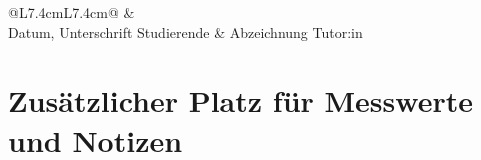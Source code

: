 \documentclass{article}
\newcommand{\bl}[1][2cm]{\underline{\hspace{#1}}}
\begin{document}
\vspace{0.25cm}
\noindent \bl[15cm]

\vspace{0.7cm}
\noindent \bl[15cm]

\vspace{0.7cm}
\noindent \bl[15cm]

\vspace{0.7cm}
\noindent \bl[15cm]

\vspace{0.8cm}

\noindent
\begin{tabular}{@{}L{7.4cm}L{7.4cm}@{}}
  \bl[6.5cm] & \bl[6.5cm] \\[6pt]
  \small Datum, Unterschrift Studierende & \small Abzeichnung Tutor:in \\
\end{tabular}

\newpage
\thispagestyle{fancy}
\section*{Zus\"atzlicher Platz f\"ur Messwerte und Notizen}
\mbox{}
\end{document}
